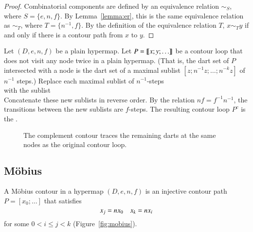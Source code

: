 \begin{proof} 
Combinatorial components are defined by an equivalence relation $\sim_S$, where
$S = \{e,n,f\}$.  By Lemma~\ref{lemma:er}, this is the same equivalence relation as
$\sim_T$, where $T = \{n^{-1},f\}$.  By the definition of the equivalence relation $T$,
$x\sim_T y$ if and only if there is a contour path from $x$ to $y$.
\end{proof}
%

\begin{definition}[complement] 
Let $(D,e,n,f)$ be a plain hypermap.
Let $P={\llbracket{x;y;\ldots}\rrbracket}$ be a contour loop that does not visit any node
twice in a plain hypermap.   (That is, the dart set of $P$ intersected with a node
is the dart set of a maximal sublist $[z;n^{-1}z;\ldots;n^{-k}z]$ of $n^{-1}$ steps.)
 Replace each maximal sublist of
$n^{-1}$-steps
\begin{displaymath}
[z;n^{-1} z; \ldots; n^{-k} z]
\end{displaymath}
with the sublist
\begin{displaymath}
[n^{-(k+1)} z;n^{-(k+2)} z;\ldots; n z]
\end{displaymath}
Concatenate these new sublists in reverse order.  By the relation $n f = f^{-1} n^{-1}$,
the transitions between the new sublists are $f$-steps.
The resulting contour loop $P^c$
is the . 
\end{definition}

\begin{figure}[htb]
\centering
{}
\caption{The complement contour traces the remaining darts
at the same nodes as the original contour loop. }
\label{fig:contour-comp}
\end{figure}


\subsection{M\"obius}

\begin{definition}
 A M\"obius contour in a hypermap
$(D,e,n,f)$ is an
injective contour path $P=[x_0;\ldots]$ that satisfies
\begin{equation}
\tlabel{eqn:mobius}
x_j = n x_0\quad x_k = n x_i
\end{equation}
for some $0 < i\le j< k$ (Figure~\ref{fig:mobius}).
%
\end{definition}


